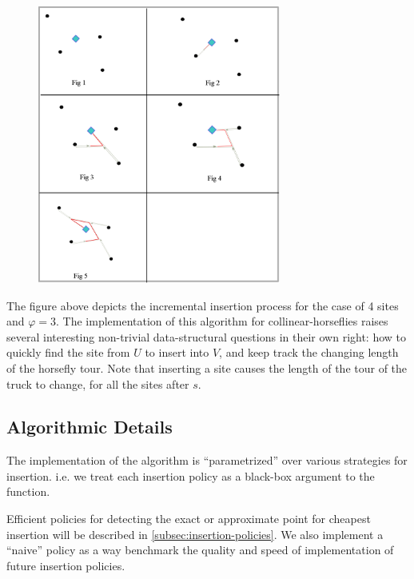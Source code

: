 \documentclass[11.5pt]{report}
\begin{document}
\begin{figure}[H]
\centering
\includegraphics[width=8cm]{../webs/docs/incremental_insertion_frames.eps}
\end{figure}

The figure above depicts the incremental insertion process for the case of 4 sites and $\varphi=3$. The 
implementation of this algorithm for collinear-horseflies raises several interesting non-trivial 
data-structural questions in their own right: how to quickly find the site from $U$ to 
insert into $V$, and keep track the changing length of the horsefly tour. Note that inserting a site 
causes the length of the tour of the truck to change, for all the sites after $s$. 
 
\subsection*{Algorithmic Details}
\newchunk The implementation of the algorithm is ``parametrized'' over various strategies for insertion. 
i.e. we treat each insertion policy as a black-box argument to the function.
 
Efficient policies for detecting the exact or approximate point for cheapest insertion will be 
described in \autoref{subsec:insertion-policies}.  We also implement a ``naive'' policy as a way 
benchmark the quality and speed of implementation of future insertion policies. 
\end{document}
